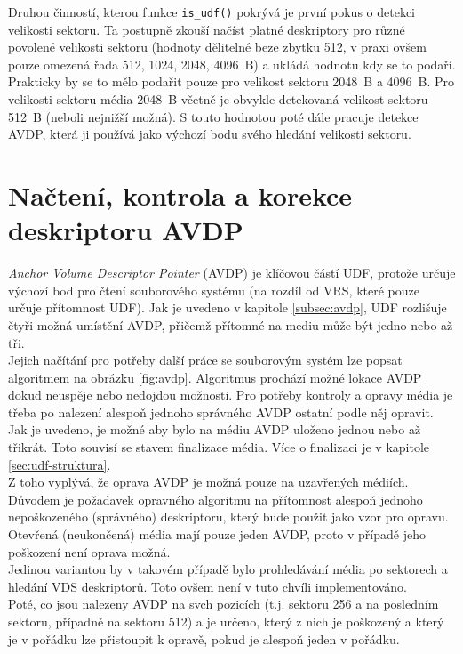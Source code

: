 Druhou činností, kterou funkce \texttt{is\_udf()} pokrývá je první pokus o detekci velikosti sektoru. Ta postupně zkouší načíst platné deskriptory pro různé povolené velikosti sektoru (hodnoty dělitelné beze zbytku 512, v praxi ovšem pouze omezená řada 512, 1024, 2048, 4096~B) a ukládá hodnotu kdy se to podaří. Prakticky by se to mělo podařit pouze pro velikost sektoru 2048~B a 4096~B. Pro velikosti sektoru média 2048~B včetně je obvykle detekovaná velikost sektoru 512~B (neboli nejnižší možná). S touto hodnotou poté dále pracuje detekce AVDP, která ji používá jako výchozí bodu svého hledání velikosti sektoru.

\section{Načtení, kontrola a korekce deskriptoru AVDP}
\label{sec:nacteni-a-oprava-avdp}
\textit{Anchor Volume Descriptor Pointer} (AVDP) je klíčovou částí UDF, protože určuje výchozí bod pro čtení souborového systému (na rozdíl od VRS, které pouze určuje přítomnost UDF). Jak je uvedeno v kapitole \ref{subsec:avdp}, UDF rozlišuje čtyři možná umístění AVDP, přičemž přítomné na mediu může být jedno nebo až tři.\\
Jejich načítání pro potřeby další práce se souborovým systém lze popsat algoritmem na obrázku \ref{fig:avdp}. Algoritmus prochází možné lokace AVDP dokud neuspěje nebo nedojdou možnosti. Pro potřeby kontroly a opravy média je třeba po nalezení alespoň jednoho správného AVDP ostatní podle něj opravit.\\
Jak je uvedeno, je možné aby bylo na médiu AVDP uloženo jednou nebo až třikrát. Toto souvisí se stavem finalizace média. Více o finalizaci je v kapitole \ref{sec:udf-struktura}.\\
Z toho vyplývá, že oprava AVDP je možná pouze na uzavřených médiích. Důvodem je požadavek opravného algoritmu na přítomnost alespoň jednoho nepoškozeného (správného) deskriptoru, který bude použit jako vzor pro opravu. Otevřená (neukončená) média mají pouze jeden AVDP, proto v případě jeho poškození není oprava možná.\\
Jedinou variantou by v takovém případě bylo prohledávání média po sektorech a hledání VDS deskriptorů. Toto ovšem není v tuto chvíli implementováno.\\
Poté, co jsou nalezeny AVDP na svch pozicích (t.j. sektoru 256 a na posledním sektoru, případně na sektoru 512) a je určeno, který z nich je poškozený a který je v pořádku lze přistoupit k opravě, pokud je alespoň jeden v pořádku.\\
